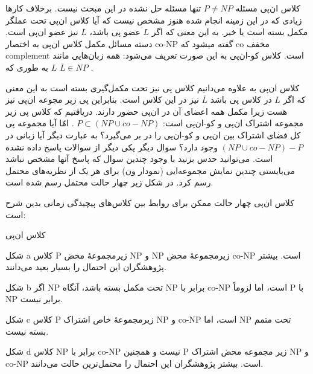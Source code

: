 \begin{itemframe}{کلاس ان‌پی}
\itm
مسئله
$P \neq NP$
تنها مسئله حل نشده در این مبحث نیست. برخلاف کار‌ها زیادی که در این زمینه انجام شده هنوز مشخص نیست که آیا کلاس ان‌پی تحت عملگر مکمل بسته است یا خیر. به این معنی که اگر
$L$
عضو پی باشد،
$\overline{L}$
نیز عضو ان‌پی است.
\itm
دسته مسائل مکمل کلاس ان‌پی به اختصار co-NP گفته میشود که co مخفف complement است.
\itm
کلاس کو-ان‌پی به این صورت تعریف می‌شود: همه زبان‌هایی مانند $L$ به طوری که
$\overline{L} \in NP$ .
\end{itemframe}

\begin{itemframe}{کلاس ان‌پی}
\itm
به علاوه می‌دانیم کلاس پی نیز تحت مکمل‌گیری بسته است به این معنی که اگر $ L $ در کلاس پی باشد $ \overbar{L} $ نیز در این کلاس است. بنابراین پی زیر مجوعه ان‌پی نیز هست زیرا مکمل همه اعضای آن در ان‌پی حضور دارند.
\itm
دریافتیم که کلاس پی زیر مجموعه اشتراک ان‌پی و کو-ان‌پی است: $ P \subset (NP \cup co-NP)$ . امّا آیا مجموعه پی کل فضای اشتراک بین ان‌پی و کو-ان‌پی را در بر می‌گیرد؟ به عبارت دیگر آیا زبانی در $(NP \cup co-NP) -P $ وجود دارد؟
\itm
سوال دیگر یکی دیگر از سوالات پاسخ داده نشده است. می‌توانید حدس بزنید با وجود چندین سوال که پاسخ آنها مشخص نباشد می‌بایستی چندین نمایش مجموعه‌ایی (نمودار ون) برای هر یک از نظریه‌های محتمل رسم کرد. در شکل زیر چهار حالت محتمل رسم شده است.
\end{itemframe}

\begin{itemframe}{کلاس ان‌پی}
\itm
چهار حالت ممکن برای روابط بین کلاس‌های پیچیدگی زمانی بدین شرح است:
\end{itemframe}

\begin{itemframe}{کلاس ان‌پی}
\item[شکل a]
کلاس P زیرمجموعهٔ محض NP و NP زیرمجموعهٔ محض co-NP است. بیشتر پژوهشگران این احتمال را بسیار بعید می‌دانند.
\item[شکل b]
اگر NP تحت مکمل بسته باشد، آنگاه NP برابر با co-NP است، اما لزوماً P با NP برابر نیست.
\item[شکل c]
کلاس P زیرمجموعهٔ خاص اشتراک NP و co-NP است، اما NP تحت متمم بسته نیست.
\item[شکل d]
کلاس NP برابر با co-NP نیست و همچنین P زیر مجموعه محض اشتراک NP و co-NP است. بیشتر پژوهشگران این احتمال را محتمل‌ترین حالت می‌دانند.
\end{itemframe}

